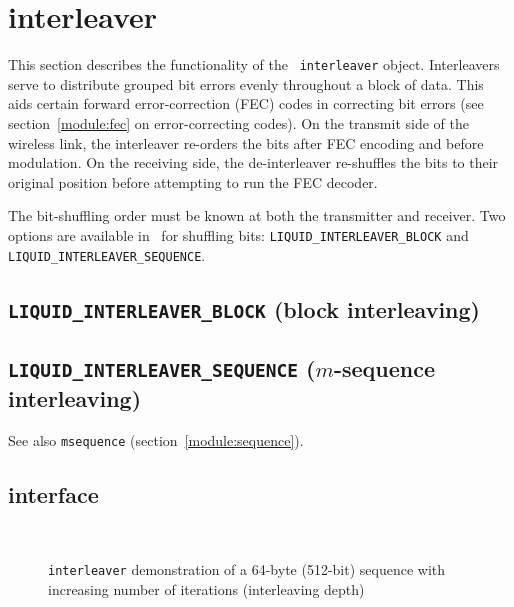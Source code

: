 % 
%

\section{interleaver}
\label{module:interleaver}

This section describes the functionality of the \liquid\
{\tt interleaver} object.
Interleavers serve to distribute grouped bit errors evenly throughout a block
of data.
This aids certain forward error-correction (FEC) codes in correcting
bit errors (see section~\ref{module:fec} on error-correcting codes).
On the transmit side of the wireless link, the interleaver re-orders the bits
after FEC encoding and before modulation.
On the receiving side, the de-interleaver re-shuffles the bits to their
original position before attempting to run the FEC decoder.


The bit-shuffling order must be known at both the transmitter and receiver.
Two options are available in \liquid\ for shuffling bits:
{\tt LIQUID\_INTERLEAVER\_BLOCK} and {\tt LIQUID\_INTERLEAVER\_SEQUENCE}.

\subsection{{\tt LIQUID\_INTERLEAVER\_BLOCK} (block interleaving)}
\label{module:interleaver:block}

\subsection{{\tt LIQUID\_INTERLEAVER\_SEQUENCE} ($m$-sequence interleaving)}
\label{module:interleaver:sequence}
See also {\tt msequence} (section~\ref{module:sequence}).

\subsection{interface}
\label{module:interleaver:interface}

\begin{figure}
\centering
\mbox{
   \quad
   \quad
}
\mbox{
   \quad
   \quad
}
\caption{{\tt interleaver} demonstration of a 64-byte (512-bit) sequence with
increasing number of iterations (interleaving depth)}
\label{fig:module:interleaver:scatterplot}
\end{figure}


